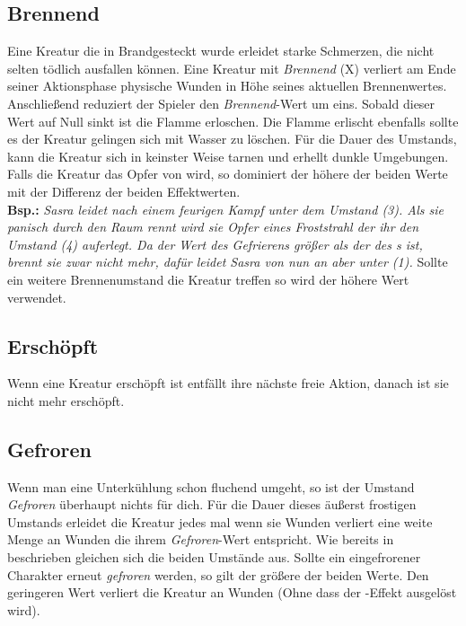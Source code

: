 \subsection*{Brennend} \label{ef:brennend}
Eine Kreatur die in Brandgesteckt wurde erleidet starke Schmerzen, die nicht selten tödlich ausfallen können. Eine Kreatur mit \textit{Brennend} (X) verliert am Ende seiner Aktionsphase physische Wunden in Höhe seines aktuellen Brennenwertes. Anschließend reduziert der Spieler den \textit{Brennend}-Wert um eins. Sobald dieser Wert auf Null sinkt ist die Flamme erloschen. Die Flamme erlischt ebenfalls sollte es der Kreatur gelingen sich mit Wasser zu löschen. Für die Dauer des Umstands, kann die Kreatur sich in keinster Weise tarnen und erhellt dunkle Umgebungen. Falls die Kreatur das Opfer von \textit{} wird, so dominiert der höhere der beiden Werte mit der Differenz der beiden Effektwerten. \\
\textbf{Bsp.:} \textit{Sasra leidet nach einem feurigen Kampf unter dem Umstand  (3). Als sie panisch durch den Raum rennt wird sie Opfer eines Froststrahl der ihr den Umstand  (4) auferlegt. Da der Wert des Gefrierens größer als der des s ist, brennt sie zwar nicht mehr, dafür leidet Sasra von nun an aber unter  (1).}
Sollte ein weitere Brennenumstand die Kreatur treffen so wird der höhere Wert verwendet.

\subsection*{Erschöpft} \label{ef:erschoepft}
Wenn eine Kreatur erschöpft ist entfällt ihre nächste freie Aktion, danach ist sie nicht mehr erschöpft.

\subsection*{Gefroren} \label{ef:gefroren}
Wenn man eine Unterkühlung schon fluchend umgeht, so ist der Umstand \textit{Gefroren} überhaupt nichts für dich. Für die Dauer dieses äußerst frostigen Umstands erleidet die Kreatur jedes mal wenn sie Wunden verliert eine weite Menge an Wunden die ihrem \textit{Gefroren}-Wert entspricht. Wie bereits in \textit{} beschrieben gleichen sich die beiden Umstände aus. Sollte ein eingefrorener Charakter erneut \textit{gefroren} werden, so gilt der größere der beiden Werte. Den geringeren Wert verliert die Kreatur an Wunden (Ohne dass der \textit{}-Effekt ausgelöst wird).

